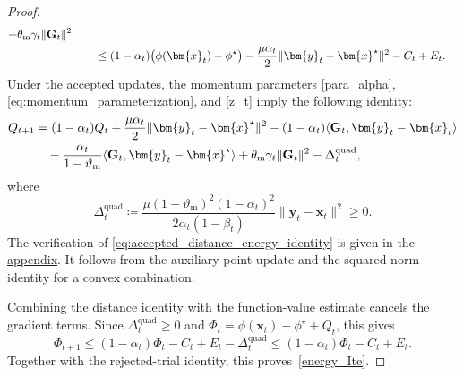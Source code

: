 \documentclass{article}
\begin{document}
\begin{proof}
\begin{align}
+\theta_{\mathrm{m}}\gamma_t\|\mathbf{G}_t\|^2
\notag\\
&\qquad\le
(1-\alpha_t)\bigl(\phi(\bm{x}_t)-\phi^\star\bigr)
-\frac{\mu\alpha_t}{2}\|\bm{y}_t-\bm{x}^\star\|^2
-C_t+E_t.
\label{eq:checked_energy_part}
\end{align}
Under the accepted updates, the momentum parameters \eqref{para_alpha}, \eqref{eq:momentum_parameterization}, and \eqref{z_t}
 imply the following identity:
\begin{align}
Q_{t+1}
&=
(1-\alpha_t)Q_t
+\frac{\mu\alpha_t}{2}\|\bm{y}_t-\bm{x}^\star\|^2
-(1-\alpha_t)\langle\mathbf{G}_t,\bm{y}_t-\bm{x}_t\rangle
\notag\\
&\quad
-\frac{\alpha_t}{1-\vartheta_{\mathrm{m}}}
\langle\mathbf{G}_t,\bm{y}_t-\bm{x}^\star\rangle
+\theta_{\mathrm{m}}\gamma_t\|\mathbf{G}_t\|^2
-\Delta_t^{\mathrm{quad}},
\label{eq:accepted_distance_energy_identity}
\end{align}
where
\[
\Delta_t^{\mathrm{quad}}\coloneqq 
\frac{\mu(1-\vartheta_{\mathrm{m}})^2(1-\alpha_t)^2}
{2\alpha_t(1-\beta_t)}
\|\bm{y}_t-\bm{x}_t\|^2\ge0.
\]
The verification of \eqref{eq:accepted_distance_energy_identity} is given in the  \hyperref[proof:energy_algebra]{appendix}. It follows from the auxiliary-point update and the squared-norm identity for a convex combination.

Combining the distance identity with the function-value estimate cancels the gradient terms. Since $\Delta_t^{\mathrm{quad}}\geq0$ and $\Phi_t=\phi(\bm{x}_t)-\phi^\star+Q_t$, this gives
\begin{equation}\label{eq:energy_quadratic_closure}
\Phi_{t+1}
\le
(1-\alpha_t)\Phi_t-C_t+E_t-\Delta_t^{\mathrm{quad}}
\le
(1-\alpha_t)\Phi_t-C_t+E_t.
\end{equation}
Together with the rejected-trial identity, this proves~\eqref{energy_Ite}.
\end{proof}
\end{document}
